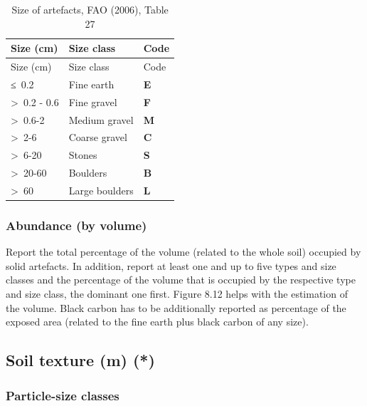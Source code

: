 \documentclass[
  letterpaper,
  DIV=11,
  numbers=noendperiod]{scrreprt}
\begin{document}
\begin{longtable}[]{@{}lll@{}}
\caption{Size of artefacts, FAO (2006), Table 27}\tabularnewline
\toprule()
Size (cm) & Size class & Code \\
\midrule()
\endfirsthead
\toprule()
Size (cm) & Size class & Code \\
\midrule()
\endhead
≤~0.2 & Fine earth & \textbf{E} \\
\textgreater~0.2 - 0.6 & Fine gravel & \textbf{F} \\
\textgreater~0.6-2 & Medium gravel & \textbf{M} \\
\textgreater~2-6 & Coarse gravel & \textbf{C} \\
\textgreater~6-20 & Stones & \textbf{S} \\
\textgreater~20-60 & Boulders & \textbf{B} \\
\textgreater~60 & Large boulders & \textbf{L} \\
\bottomrule()
\end{longtable}

\hypertarget{abundance-by-volume-1}{%
\subsubsection{Abundance (by volume)}\label{abundance-by-volume-1}}

Report the total percentage of the volume (related to the whole soil)
occupied by solid artefacts. In addition, report at least one and up to
five types and size classes and the percentage of the volume that is
occupied by the respective type and size class, the dominant one first.
Figure 8.12 helps with the estimation of the volume. Black carbon has to
be additionally reported as percentage of the exposed area (related to
the fine earth plus black carbon of any size).

\hypertarget{soil-texture-m}{%
\subsection{Soil texture (m) (*)}\label{soil-texture-m}}

\hypertarget{particle-size-classes}{%
\subsubsection{Particle-size classes}\label{particle-size-classes}}
\end{document}
